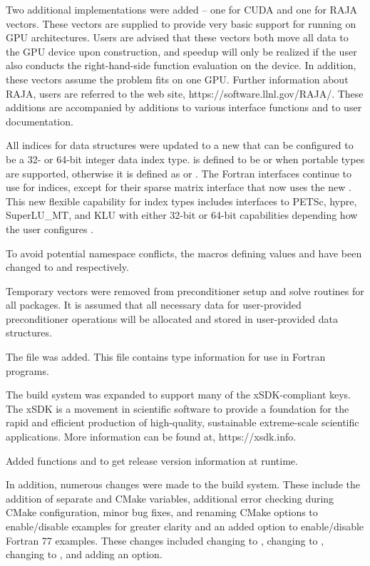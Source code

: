 Two additional {\nvector} implementations were added -- one for
CUDA and one for RAJA vectors.  
These vectors are supplied to provide very basic support for running
on GPU architectures.  Users are advised that these vectors both move all data
to the GPU device upon construction, and speedup will only be realized if the
user also conducts the right-hand-side function evaluation on the device.
In addition, these vectors assume the problem fits on one GPU.
Further information about RAJA, users are referred to the web site, 
https://software.llnl.gov/RAJA/.
These additions are accompanied by additions to various interface functions
and to user documentation.

All indices for data structures were updated to a new  that
can be configured to be a 32- or 64-bit integer data index type. 
 is defined to be  or  when portable types are
supported, otherwise it is defined as  or .
The Fortran interfaces continue to use  for indices, except for 
their sparse matrix interface that now uses the new .
This new flexible capability for index types includes interfaces to 
PETSc, hypre, SuperLU\_MT, and KLU with 
either 32-bit or 64-bit capabilities depending how the user configures 
{\sundials}.

To avoid potential namespace conflicts, the macros defining 
values  and  have been changed to  and
 respectively.

Temporary vectors were removed from preconditioner setup and solve
routines for all packages.  It is assumed that all necessary data
for user-provided preconditioner operations will be allocated and
stored in user-provided data structures.

The file  was added.  This file contains 
{\sundials} type information for use in Fortran programs.

The build system was expanded to support many of the xSDK-compliant keys. 
The xSDK is a movement in scientific software to provide a foundation for the
rapid and efficient production of high-quality, 
sustainable extreme-scale scientific applications.  More information can
be found at, https://xsdk.info.

Added functions  and  to
get {\sundials} release version information at runtime.

In addition, numerous changes were made to the build system.
These include the addition of separate  and  
CMake variables, additional error checking during CMake configuration,
minor bug fixes, and renaming CMake options to enable/disable examples 
for greater clarity and an added option to enable/disable Fortran 77 examples.
These changes included changing  to , 
changing  to , changing  to 
, and adding an  option.

